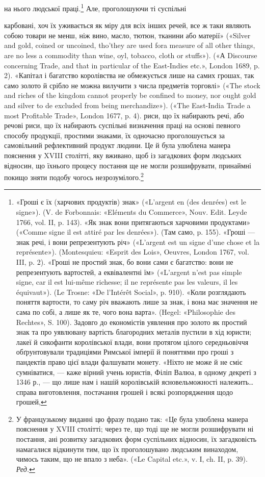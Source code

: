 на нього людської праці.\footnote{
«Гроші є їх (харчових продуктів) знак» («L’argent en (des denrées)
est le signe»). (V. de Forbonnais: «Eléments du Commerce»,
Nouv. Edit. Leyde 1766, vol. II, p. 143). «Як знак вони притягаються
харчовими продуктами» («Comme signe il est attiré par les denrées»). (Там
само, p. 155). «Гроші — знак речі, і вони репрезентують річ» («L’argent
est un signe d’une chose et la représente»). (Montesquieu: «Esprit des
Lois», Oeuvres, London 1767, vol. III, p. 2). «Гроші не простий знак,
бо вони сами є багатство: вони не репрезентують вартостей, а еквівалентні
їм» («L’argent n’est pas simple signe, car il est lui-même richesse; il
ne représente pas les valeurs, il les équivaut»). (Le Trosne: «De l’Intérêt
Social», p. 910). «Коли розглядають поняття вартости, то саму річ
вважають лише за знак, і вона має значення не сама по собі, а лише як
те, чого вона варта». (Hegel: «Philosophie des Rechtes», S. 100). Задовго
до економістів уявлення про золото як простий знак та про уявлювану
вартість благородних металів пустили в хід юристи; лакеї й сикофанти
королівської влади, вони протягом цілого середньовіччя обґрунтовували
традиціями Римської імперії й поняттями про гроші з пандектів
право цієї влади фалшувати монету. «Ніхто не може й не сміє сумніватися,
— каже вірний учень юристів, Філіп Валюа, в одному декреті з 1346 р., —
що лише нам і нашій королівській ясновельможності належить\dots{} справа
виготовлення, постачання грошей і всякі розпорядження щодо грошей,
} Але, проголошуючи ті суспільні

карбовані, хоч їх уживається як міру для всіх інших речей, все ж таки
являють собою товари не менш, ніж вино, масло, тютюн, тканини або матерії»
(«Silver and gold, coined or uncoined, tho’they are used fora measure
of all other things, are no less a commodity than wine, oyl, tobacco,
cloth or stuffs»). («А Discourse concerning Trade, and that in particular
of the East-Indies etc.», London 1689, p. 2). «Капітал і багатство королівства
не обмежується лише на самих грошах, так само золото й срібло
не можна вилучити з числа предметів торговлі» («The stock and riches
of the kingdom cannot properly be confined to money, nor ought gold and
silver to de excluded from being merchandize»). («The East-India Trade
a most Profitable Trade», London 1677, p. 4).
риси, що їх набирають речі, або речові риси, що їх набирають
суспільні визначення праці на основі певного способу продукції,
простими знаками, їх одночасно проголошується за самовільний
рефлективний продукт людини. Це й була улюблена манера
пояснення у XVIII столітті, яку вживано, щоб із загадкових
форм людських відносин, що їхнього процесу постання ще не
могли розшифрувати, принаймні покищо зняти подобу чогось
незрозумілого.\footnote*{
У французькому виданні цю фразу подано так: «Це була улюблена
манера пояснення у XVIII столітті; через те, що тоді ще не могли розшифрувати
ні постання, ані розвитку загадкових форм суспільних відносин,
їх загадковість намагалися відкинути тим, що їх проголошувано
людським винаходом, чимось таким, що не впало з неба». («Le Capital
etc.», v. І, ch. II, p. 39). \emph{Ред.}
}

